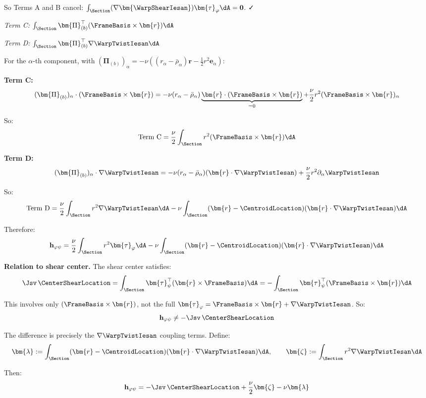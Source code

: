\begin{Details}
So Terms A and B cancel:
\(\int_\Section (\nabla\bm{\WarpShearIesan})\bm{\tau}_\varphi \dA = \mathbf{0}\).
✓

\emph{Term C:}
\(\int_\Section \bm{\Pi}_{(b)}^\top (\FrameBasis \times \bm{r}) \dA\)

\emph{Term D:}
\(\int_\Section \bm{\Pi}_{(b)}^\top \nabla\WarpTwistIesan \dA\)

For the \(\alpha\)-th component, with
\((\bm{\Pi}_{(b)})_\alpha = -\nu((r_\alpha - \bar{\rho}_\alpha)\bm{r} - \frac{1}{2}r^2\bm{e}_\alpha)\):

\textbf{Term C:}
\[(\bm{\Pi}_{(b)})_\alpha \cdot (\FrameBasis \times \bm{r}) = -\nu(r_\alpha - \bar{\rho}_\alpha)\underbrace{\bm{r} \cdot (\FrameBasis \times \bm{r})}_{=0} + \frac{\nu}{2}r^2(\FrameBasis \times \bm{r})_\alpha\]

So:
\[\text{Term C} = \frac{\nu}{2}\int_\Section r^2 (\FrameBasis \times \bm{r}) \dA\]

\textbf{Term D:}
\[(\bm{\Pi}_{(b)})_\alpha \cdot \nabla\WarpTwistIesan = -\nu(r_\alpha - \bar{\rho}_\alpha)(\bm{r} \cdot \nabla\WarpTwistIesan) + \frac{\nu}{2}r^2 \partial_\alpha\WarpTwistIesan\]

So:
\[\text{Term D} = \frac{\nu}{2}\int_\Section r^2 \nabla\WarpTwistIesan \dA - \nu\int_\Section (\bm{r} - \CentroidLocation)(\bm{r} \cdot \nabla\WarpTwistIesan) \dA\]

Therefore:
\[\mathbf{h}_{\varphi\psi} = \frac{\nu}{2}\int_\Section r^2 \bm{\tau}_\varphi \dA - \nu\int_\Section (\bm{r} - \CentroidLocation)(\bm{r} \cdot \nabla\WarpTwistIesan) \dA\]

\textbf{Relation to shear center.} The shear center satisfies:
\[\Jsv\,\CenterShearLocation = \int_\Section \bm{\tau}_\psi^\top (\bm{r} \times \FrameBasis) \dA = -\int_\Section \bm{\tau}_\psi^\top (\FrameBasis \times \bm{r}) \dA\]

This involves only \((\FrameBasis \times \bm{r})\), not the full
\(\bm{\tau}_\varphi = \FrameBasis \times \bm{r} + \nabla\WarpTwistIesan\).
So: \[\mathbf{h}_{\varphi\psi} \neq -\Jsv\,\CenterShearLocation\]

The difference is precisely the \(\nabla\WarpTwistIesan\) coupling
terms. Define:
\[\bm{\lambda} := \int_\Section (\bm{r} - \CentroidLocation)(\bm{r} \cdot \nabla\WarpTwistIesan) \dA, \qquad \bm{\zeta} := \int_\Section r^2 \nabla\WarpTwistIesan \dA\]

Then:
\[\mathbf{h}_{\varphi\psi} = -\Jsv\,\CenterShearLocation + \frac{\nu}{2}\bm{\zeta} - \nu\bm{\lambda}\]
\end{Details}

